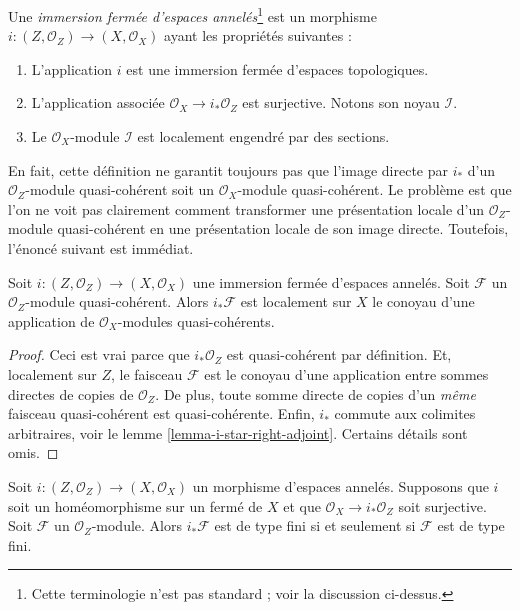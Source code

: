 \begin{definition}
\label{definition-closed-immersion}
Une {\it immersion fermée d'espaces annelés}\footnote{Cette terminologie n'est
pas standard ; voir la discussion ci-dessus.} est un morphisme
$i : (Z, \mathcal{O}_Z) \to (X, \mathcal{O}_X)$
ayant les propriétés suivantes :
\begin{enumerate}
\item L'application $i$ est une immersion fermée d'espaces topologiques.
\item L'application associée $\mathcal{O}_X \to i_*\mathcal{O}_Z$
est surjective. Notons son noyau $\mathcal{I}$.
\item Le $\mathcal{O}_X$-module $\mathcal{I}$ est localement
engendré par des sections.
\end{enumerate}
\end{definition}

\noindent
En fait, cette définition ne garantit toujours pas que
l'image directe par $i_*$ d'un $\mathcal{O}_Z$-module quasi-cohérent soit un
$\mathcal{O}_X$-module quasi-cohérent. Le problème est que
l'on ne voit pas clairement comment transformer une présentation locale d'un
$\mathcal{O}_Z$-module quasi-cohérent en une présentation locale
de son image directe. Toutefois, l'énoncé suivant
est immédiat.

\begin{lemma}
\label{lemma-i-star-quasi-coherent}
Soit $i : (Z, \mathcal{O}_Z) \to (X, \mathcal{O}_X)$
une immersion fermée d'espaces annelés.
Soit $\mathcal{F}$ un $\mathcal{O}_Z$-module quasi-cohérent.
Alors $i_*\mathcal{F}$ est localement sur $X$ le conoyau d'une
application de $\mathcal{O}_X$-modules quasi-cohérents.
\end{lemma}

\begin{proof}
Ceci est vrai parce que $i_*\mathcal{O}_Z$ est quasi-cohérent
par définition. Et, localement sur $Z$, le faisceau $\mathcal{F}$
est le conoyau d'une application entre sommes directes de copies
de $\mathcal{O}_Z$. De plus, toute somme directe de copies d'un
{\it même} faisceau quasi-cohérent est quasi-cohérente.
Enfin, $i_*$ commute aux colimites arbitraires,
voir le lemme \ref{lemma-i-star-right-adjoint}. Certains détails sont omis.
\end{proof}

\begin{lemma}
\label{lemma-i-star-reflects-finite-type}
Soit $i : (Z, \mathcal{O}_Z) \to (X, \mathcal{O}_X)$ un morphisme d'espaces
annelés. Supposons que $i$ soit un homéomorphisme sur un fermé de $X$ et
que $\mathcal{O}_X \to i_*\mathcal{O}_Z$ soit surjective.
Soit $\mathcal{F}$ un $\mathcal{O}_Z$-module.
Alors $i_*\mathcal{F}$ est de type fini si et seulement si
$\mathcal{F}$ est de type fini.
\end{lemma}

